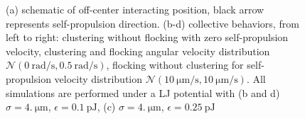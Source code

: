 \documentclass[a4paper, notitlepage]{report} %
\begin{document}
	\begin{figure}[htp]
		\centering
		
		\caption{(a) schematic of off-center interacting position, black arrow represents self-propulsion direction. (b-d) collective behaviors, from left to right: clustering without flocking with zero self-propulsion velocity, clustering and flocking angular velocity distribution $\mathcal{N}(\SI{0}{\radian\per\second}, \SI{0.5}{\radian\per\second})$, flocking without clustering for self-propulsion velocity distribution $\mathcal{N}(\SI{10}{\um\per\second}, \SI{10}{\um\per\second})$. All simulations are performed under a LJ potential with (b and d) $\sigma = \SI{4.}{\um}$, $\epsilon = \SI{0.1}{\pico\joule}$, (c) $\sigma = \SI{4.}{\um}$, $\epsilon = \SI{0.25}{\pico\joule}$}
	\end{figure}
	
	\printbibliography
\end{document}
